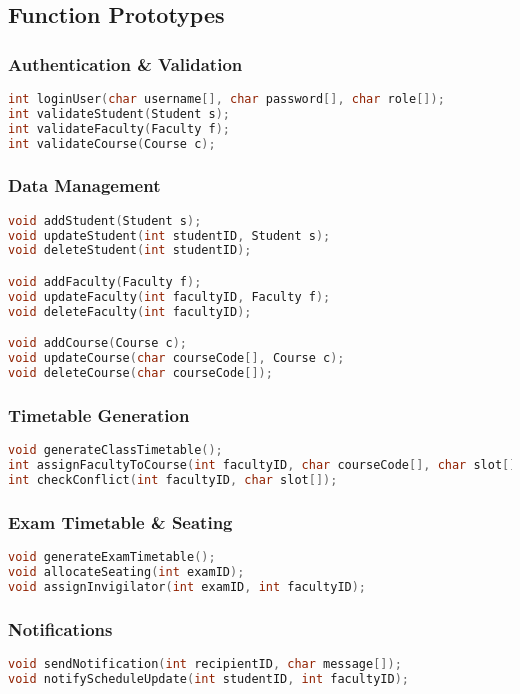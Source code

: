 \documentclass[12pt]{article}
\begin{document}
\subsection{Function Prototypes}

\subsubsection{Authentication \& Validation}
\begin{lstlisting}[language=C]
int loginUser(char username[], char password[], char role[]);
int validateStudent(Student s);
int validateFaculty(Faculty f);
int validateCourse(Course c);
\end{lstlisting}

\subsubsection{Data Management}
\begin{lstlisting}[language=C]
void addStudent(Student s);
void updateStudent(int studentID, Student s);
void deleteStudent(int studentID);

void addFaculty(Faculty f);
void updateFaculty(int facultyID, Faculty f);
void deleteFaculty(int facultyID);

void addCourse(Course c);
void updateCourse(char courseCode[], Course c);
void deleteCourse(char courseCode[]);
\end{lstlisting}

\subsubsection{Timetable Generation}
\begin{lstlisting}[language=C]
void generateClassTimetable();
int assignFacultyToCourse(int facultyID, char courseCode[], char slot[]);
int checkConflict(int facultyID, char slot[]);
\end{lstlisting}

\subsubsection{Exam Timetable \& Seating}
\begin{lstlisting}[language=C]
void generateExamTimetable();
void allocateSeating(int examID);
void assignInvigilator(int examID, int facultyID);
\end{lstlisting}

\subsubsection{Notifications}
\begin{lstlisting}[language=C]
void sendNotification(int recipientID, char message[]);
void notifyScheduleUpdate(int studentID, int facultyID);
\end{lstlisting}
\end{document}
